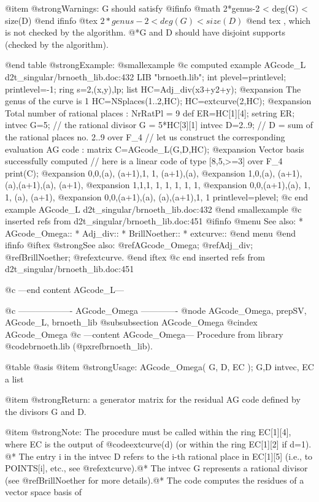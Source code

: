 @item @strong{Warnings:}
G should satisfy 
@ifinfo
@math{ 2*genus-2 < deg(G) < size(D) }
@end ifinfo
@tex
$ 2*genus-2 < deg(G) < size(D) $
@end tex
, which is
not checked by the algorithm.
@*G and D should have disjoint supports (checked by the algorithm).

@end table
@strong{Example:}
@smallexample
@c computed example AGcode_L d2t_singular/brnoeth_lib.doc:432 
LIB "brnoeth.lib";
int plevel=printlevel;
printlevel=-1;
ring s=2,(x,y),lp;
list HC=Adj_div(x3+y2+y);
@expansion{} The genus of the curve is 1
HC=NSplaces(1..2,HC);
HC=extcurve(2,HC);
@expansion{} Total number of rational places : NrRatPl = 9
def ER=HC[1][4];
setring ER;
intvec G=5;      // the rational divisor G = 5*HC[3][1]
intvec D=2..9;   // D = sum of the rational places no. 2..9 over F_4
// let us construct the corresponding evaluation AG code :
matrix C=AGcode_L(G,D,HC);
@expansion{} Vector basis successfully computed 
// here is a linear code of type [8,5,>=3] over F_4
print(C);
@expansion{} 0,0,(a),  (a+1),1,  1,    (a+1),(a),  
@expansion{} 1,0,(a),  (a+1),(a),(a+1),(a),  (a+1),
@expansion{} 1,1,1,    1,    1,  1,    1,    1,    
@expansion{} 0,0,(a+1),(a),  1,  1,    (a),  (a+1),
@expansion{} 0,0,(a+1),(a),  (a),(a+1),1,    1     
printlevel=plevel;
@c end example AGcode_L d2t_singular/brnoeth_lib.doc:432
@end smallexample
@c inserted refs from d2t_singular/brnoeth_lib.doc:451
@ifinfo
@menu
See also:
* AGcode_Omega::
* Adj_div::
* BrillNoether::
* extcurve::
@end menu
@end ifinfo
@iftex
@strong{See also:}
@ref{AGcode_Omega};
@ref{Adj_div};
@ref{BrillNoether};
@ref{extcurve}.
@end iftex
@c end inserted refs from d2t_singular/brnoeth_lib.doc:451

@c ---end content AGcode_L---

@c ------------------- AGcode_Omega -------------
@node AGcode_Omega, prepSV, AGcode_L, brnoeth_lib
@subsubsection AGcode_Omega
@cindex AGcode_Omega
@c ---content AGcode_Omega---
Procedure from library @code{brnoeth.lib} (@pxref{brnoeth_lib}).

@table @asis
@item @strong{Usage:}
AGcode_Omega( G, D, EC ); G,D intvec, EC a list

@item @strong{Return:}
a generator matrix for the residual AG code defined by the
divisors G and D.

@item @strong{Note:}
The procedure must be called within the ring EC[1][4],
where EC is the output of @code{extcurve(d)} (or within
the ring EC[1][2] if d=1). @*
The entry i in the intvec D refers to the i-th rational
place in EC[1][5] (i.e., to POINTS[i], etc., see @ref{extcurve}).@*
The intvec G represents a rational divisor (see @ref{BrillNoether}
for more details).@*
The code computes the residues of a vector space basis of

